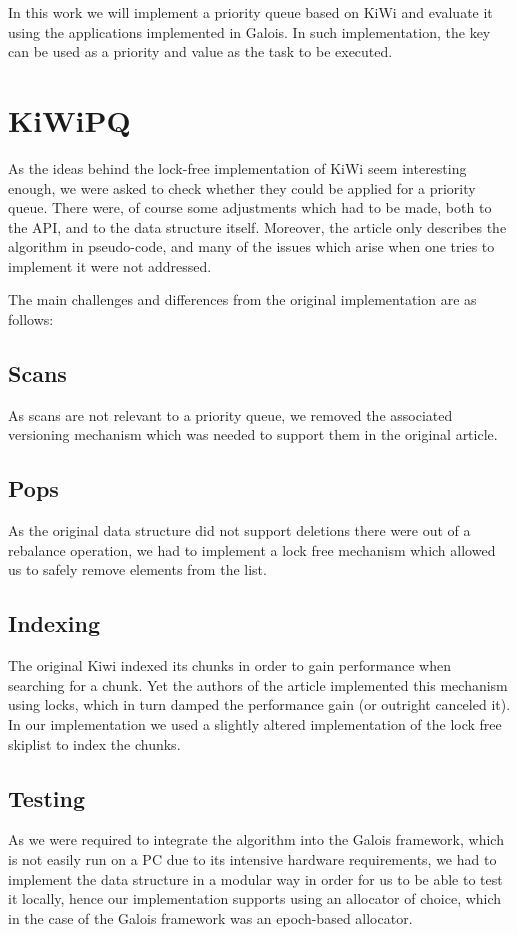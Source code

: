 \documentclass[letterpaper, 10 pt, conference]{ieeeconf}  %
\begin{document}
In this work we will implement a priority queue based on KiWi and evaluate it using the applications implemented in Galois. In such implementation, the key can be used as a priority and value as the task to be executed.


\section{KiWiPQ}

As the ideas behind the lock-free implementation of KiWi seem interesting enough, we were asked to check whether they could be applied for a priority queue. 
There were, of course some adjustments which had to be made, both to the API, and 
to the data structure itself.
Moreover, the article only describes the algorithm in pseudo-code, and many of the issues which arise when one tries to implement it were not addressed.

The main challenges and differences from the original implementation are as follows:

\subsection{Scans}As scans are not relevant to a priority queue, we removed the associated versioning mechanism which was needed to support them in the original article.

\subsection{Pops}As the original data structure did not support deletions there were out of a rebalance operation, we had to implement a lock free mechanism which allowed us to safely remove elements from the list.

\subsection{Indexing}The original Kiwi indexed its chunks in order to gain performance when searching for a chunk. Yet the authors of the article implemented this mechanism using locks, which in turn damped the performance gain (or outright canceled it).
In our implementation we used a slightly altered implementation of the lock free skiplist to index the chunks.

\subsection{Testing}As we were required to integrate the algorithm into the Galois framework, which is not easily run on a PC due to its intensive hardware requirements, we had to implement the data structure in a modular way in order for us to be able to test it locally,
hence our implementation supports using an allocator of choice, which in the case of the Galois framework was an epoch-based allocator.
\end{document}
